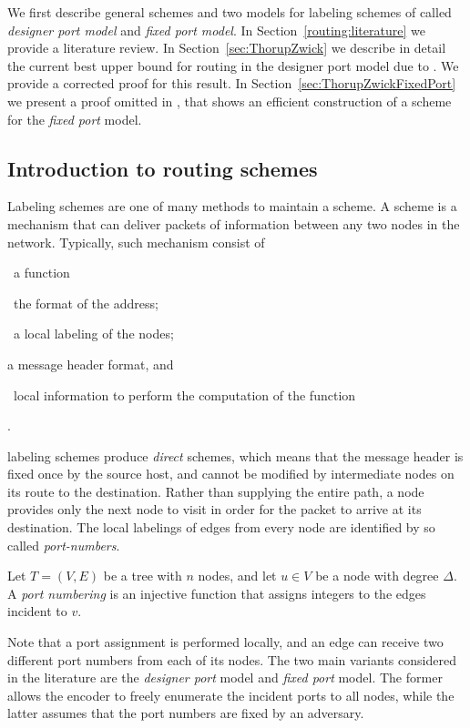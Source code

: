 We first describe general \routing schemes and two models for labeling schemes of \routing called \textit{designer port  model} and 
\textit{fixed port model}.
In Section~\ref{routing:literature} we  provide a literature review.
In Section~\ref{sec:ThorupZwick} we describe in detail the current best upper bound for routing in the designer port model due to . We provide a corrected proof for this result.
In Section~\ref{sec:ThorupZwickFixedPort}  we  present a proof omitted in , that shows an efficient construction of a \routing scheme for the \emph{fixed port} model.

\subsection{Introduction to routing schemes}\label{section:routing-intro}
Labeling schemes are one of many methods to maintain a \routing scheme.
A \routing scheme is a mechanism that can deliver packets of information between any two nodes in the network.
Typically, such mechanism consist of 
\begin{inparaenum} 
	\item~a \routing  function \item~the format of the address; \item~a  local labeling of the nodes; \item a message  header format, and \item~local information  to perform the computation of the \routing function \end{inparaenum}  \cite{Fraigniaud01}.
	
\routing labeling schemes produce \emph{direct}  \routing schemes, which means that the message header is fixed  once by the source host, and cannot be modified by intermediate nodes on its route to the destination.
Rather than supplying the entire path,  a node  provides only the next node to visit in order for the packet to arrive at its destination.  The local labelings of  edges from every node are identified by so called \emph{port-numbers}.
	\begin{definition}\label{dfn:port}
		Let $T=(V,E)$ be a tree with $n$ nodes, and let $u \in V$ be a node with degree $\Delta$.
		A \emph{port numbering} is an injective  function that assigns integers to the edges incident to $v$.
	\end{definition}
	
Note that a port assignment is performed  locally, and an edge can receive two different port numbers from each of its nodes.
The two main variants  considered in the literature are the  \emph{designer port} model and \emph{fixed port} model.
The former allows the encoder  to freely enumerate the  incident ports to all nodes, while the latter assumes that the port numbers are fixed by an adversary. 

